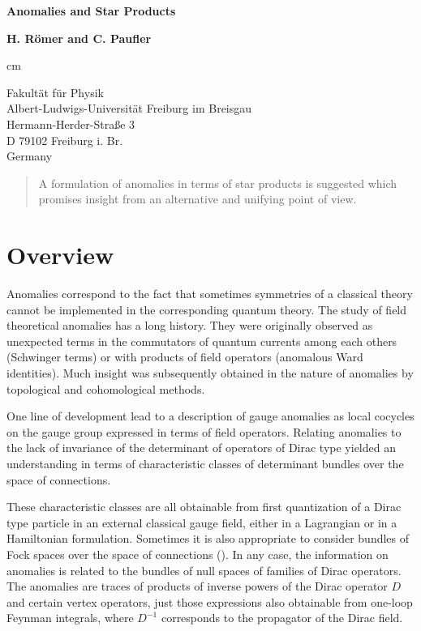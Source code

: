 \documentclass[a4paper,12pt]{article}
\begin{document}
 
\begin{center}
\vspace*{1.0cm}

{\LARGE{\bf Anomalies and Star Products}} 

\vskip 1.5cm

{\large {\bf H. R\"omer and C. Pauf\/ler}} 

 cm 

Fakult\"at f\"ur Physik\\ 
Albert-Ludwigs-Universit\"at Freiburg im Breisgau\\ 
Hermann-Herder-Stra\ss e 3\\ 
D 79102 Freiburg i. Br.\\
Germany


\end{center}

\vspace{1 cm}

\begin{abstract}
A formulation of anomalies in terms of star products is suggested which promises 
insight from an alternative and unifying point of view.
\end{abstract}

\vspace{1 cm} 

\section{Overview}

Anomalies correspond to the fact that sometimes symmetries of a classical
theory cannot be implemented in the corresponding quantum theory. The study of
field theoretical anomalies has a long history. They were originally observed as 
unexpected terms in the commutators of quantum currents among each others
(Schwinger terms) or with products of field operators (anomalous Ward
identities). Much insight was subsequently obtained in the nature of anomalies
by topological and cohomological methods.

One line of development lead to a description of gauge anomalies as local
cocycles on the gauge group expressed in terms of field operators. Relating
anomalies to the lack of invariance of the determinant of operators of Dirac
type yielded an understanding in terms of characteristic classes of determinant
bundles over the space of connections.

These characteristic classes are all obtainable from first quantization of a
Dirac type particle in an external classical gauge field, either in a
Lagrangian or in a Hamiltonian formulation. Sometimes it is also appropriate to
consider bundles of Fock spaces over the space of connections
(\cite{CaMiMu97b,Seg85}). 
In any case, the
information on anomalies is related to the bundles of null spaces of families of 
Dirac operators. The anomalies are traces of products of inverse powers of the
Dirac operator $D$ and certain vertex operators, just those expressions also
obtainable from one-loop Feynman integrals, where $D^{-1}$ corresponds to the
propagator of the Dirac field.
\end{document}
